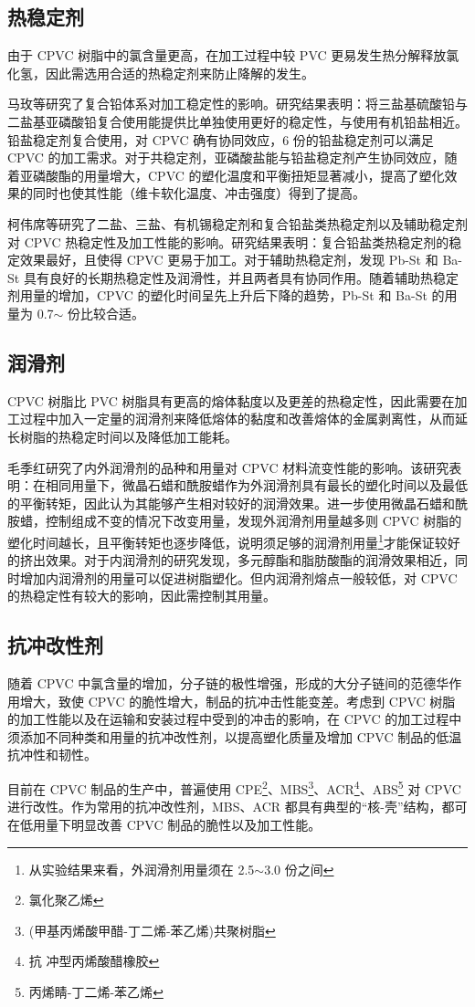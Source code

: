 \subsection{热稳定剂}
由于 CPVC 树脂中的氯含量更高，在加工过程中较 PVC 更易发生热分解释放氯化氢，因此需选用合适的热稳定剂来防止降解的发生。\par
马玫等\cite{6}研究了复合铅体系对加工稳定性的影响。研究结果表明：将三盐基硫酸铅与二盐基亚磷酸铅复合使用能提供比单独使用更好的稳定性，与使用有机铅盐相近。铅盐稳定剂复合使用，对 CPVC 确有协同效应，6 份的铅盐稳定剂可以满足 CPVC 的加工需求。对于共稳定剂，亚磷酸盐能与铅盐稳定剂产生协同效应，随着亚磷酸酯的用量增大，CPVC 的塑化温度和平衡扭矩显著减小，提高了塑化效果的同时也使其性能（维卡软化温度、冲击强度）得到了提高。\par
柯伟席等\cite{8}研究了二盐、三盐、有机锡稳定剂和复合铅盐类热稳定剂以及辅助稳定剂对 CPVC 热稳定性及加工性能的影响。研究结果表明：复合铅盐类热稳定剂的稳定效果最好，且使得 CPVC 更易于加工。对于辅助热稳定剂，发现 Pb-St 和 Ba-St 具有良好的长期热稳定性及润滑性，并且两者具有协同作用。随着辅助热稳定剂用量的增加，CPVC 的塑化时间呈先上升后下降的趋势，Pb-St 和 Ba-St 的用量为 0.7$\sim$ 份比较合适。

\subsection{润滑剂}
CPVC 树脂比 PVC 树脂具有更高的熔体黏度以及更差的热稳定性，因此需要在加工过程中加入一定量的润滑剂来降低熔体的黏度和改善熔体的金属剥离性，从而延长树脂的热稳定时间以及降低加工能耗。\par
毛季红\cite{2}研究了内外润滑剂的品种和用量对 CPVC 材料流变性能的影响。该研究表明：在相同用量下，微晶石蜡和酰胺蜡作为外润滑剂具有最长的塑化时间以及最低的平衡转矩，因此认为其能够产生相对较好的润滑效果。进一步使用微晶石蜡和酰胺蜡，控制组成不变的情况下改变用量，发现外润滑剂用量越多则 CPVC 树脂的塑化时间越长，且平衡转矩也逐步降低，说明须足够的润滑剂用量\footnote{从实验结果来看，外润滑剂用量须在 2.5$\sim$3.0 份之间}才能保证较好的挤出效果。对于内润滑剂的研究发现，多元醇酯和脂肪酸酯的润滑效果相近，同时增加内润滑剂的用量可以促进树脂塑化。但内润滑剂熔点一般较低，对 CPVC 的热稳定性有较大的影响，因此需控制其用量。

\subsection{抗冲改性剂}
随着 CPVC 中氯含量的增加，分子链的极性增强，形成的大分子链间的范德华作用增大，致使 CPVC 的脆性增大，制品的抗冲击性能变差。考虑到 CPVC 树脂的加工性能以及在运输和安装过程中受到的冲击的影响，在 CPVC 的加工过程中须添加不同种类和用量的抗冲改性剂，以提高塑化质量及增加 CPVC 制品的低温抗冲性和韧性。\par
目前在 CPVC 制品的生产中，普遍使用 CPE\footnote{氯化聚乙烯}、MBS\footnote{(甲基丙烯酸甲醋-丁二烯-苯乙烯)共聚树脂}、ACR\footnote{抗 冲型丙烯酸醋橡胶}、ABS\footnote{丙烯睛-丁二烯-苯乙烯} 对 CPVC 进行改性。作为常用的抗冲改性剂，MBS、ACR 都具有典型的“核-壳”结构，都可在低用量下明显改善 CPVC 制品的脆性以及加工性能\cite{24}。


